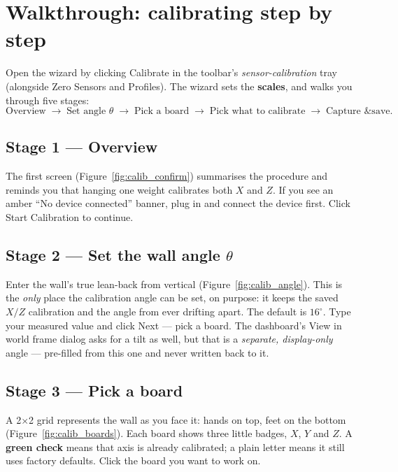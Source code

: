 \documentclass[11pt,a4paper]{article}
\begin{document}
\newpage

\section{Walkthrough: calibrating step by step}

Open the wizard by clicking \textsf{Calibrate} in the toolbar's
\emph{sensor-calibration} tray (alongside \textsf{Zero Sensors} and
\textsf{Profiles}). The wizard sets the \textbf{scales}, and walks you through five
stages:
\[
\text{Overview}\;\rightarrow\;\text{Set angle }\theta\;\rightarrow\;
\text{Pick a board}\;\rightarrow\;\text{Pick what to calibrate}\;\rightarrow\;
\text{Capture \& save}.
\]

\subsection{Stage 1 --- Overview}
The first screen (Figure~\ref{fig:calib_confirm}) summarises the procedure and
reminds you that hanging one weight calibrates both $X$ and $Z$. If you see an
amber ``No device connected'' banner, plug in and connect the device first. Click
\textsf{Start Calibration} to continue.


\subsection{Stage 2 --- Set the wall angle $\theta$}
Enter the wall's true lean-back from vertical (Figure~\ref{fig:calib_angle}). This
is the \emph{only} place the calibration angle can be set, on purpose: it keeps the
saved $X/Z$ calibration and the angle from ever drifting apart. The default is
$16^\circ$. Type your measured value and click \textsf{Next --- pick a board}.
The dashboard's \textsf{View in world frame} dialog asks for a tilt as well, but
that is a \emph{separate, display-only} angle --- pre-filled from this one and
never written back to it.


\subsection{Stage 3 --- Pick a board}
A 2$\times$2 grid represents the wall as you face it: hands on top, feet on the
bottom (Figure~\ref{fig:calib_boards}). Each board shows three little badges, $X$,
$Y$ and $Z$. A \textbf{green check} means that axis is already calibrated; a plain
letter means it still uses factory defaults. Click the board you want to work on.
\end{document}
